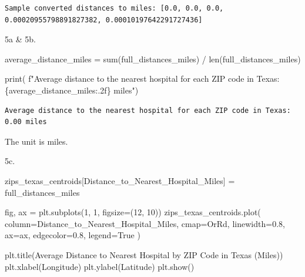 \documentclass[
  letterpaper,
  DIV=11,
  numbers=noendperiod]{scrartcl}
\newenvironment{Shaded}{\begin{snugshade}}{\end{snugshade}}
\newcommand{\BuiltInTok}[1]{\textcolor[rgb]{0.00,0.23,0.31}{#1}}
\newcommand{\DecValTok}[1]{\textcolor[rgb]{0.68,0.00,0.00}{#1}}
\newcommand{\FloatTok}[1]{\textcolor[rgb]{0.68,0.00,0.00}{#1}}
\newcommand{\NormalTok}[1]{\textcolor[rgb]{0.00,0.23,0.31}{#1}}
\newcommand{\OperatorTok}[1]{\textcolor[rgb]{0.37,0.37,0.37}{#1}}
\newcommand{\SpecialCharTok}[1]{\textcolor[rgb]{0.37,0.37,0.37}{#1}}
\newcommand{\SpecialStringTok}[1]{\textcolor[rgb]{0.13,0.47,0.30}{#1}}
\newcommand{\StringTok}[1]{\textcolor[rgb]{0.13,0.47,0.30}{#1}}
\newcommand{\VariableTok}[1]{\textcolor[rgb]{0.07,0.07,0.07}{#1}}
\begin{document}
\begin{verbatim}
Sample converted distances to miles: [0.0, 0.0, 0.0, 0.00020955798891827382, 0.00010197642291727436]
\end{verbatim}

5a \& 5b.

\begin{Shaded}
\begin{Highlighting}[]
\NormalTok{average\_distance\_miles }\OperatorTok{=} \BuiltInTok{sum}\NormalTok{(full\_distances\_miles) }\OperatorTok{/} \BuiltInTok{len}\NormalTok{(full\_distances\_miles)}

\BuiltInTok{print}\NormalTok{(}
    \SpecialStringTok{f"Average distance to the nearest hospital for each ZIP code in Texas: }\SpecialCharTok{\{}\NormalTok{average\_distance\_miles}\SpecialCharTok{:.2f\}}\SpecialStringTok{ miles"}\NormalTok{)}
\end{Highlighting}
\end{Shaded}

\begin{verbatim}
Average distance to the nearest hospital for each ZIP code in Texas: 0.00 miles
\end{verbatim}

The unit is miles.

5c.

\begin{Shaded}
\begin{Highlighting}[]
\NormalTok{zips\_texas\_centroids[}\StringTok{\textquotesingle{}Distance\_to\_Nearest\_Hospital\_Miles\textquotesingle{}}\NormalTok{] }\OperatorTok{=}\NormalTok{ full\_distances\_miles}

\NormalTok{fig, ax }\OperatorTok{=}\NormalTok{ plt.subplots(}\DecValTok{1}\NormalTok{, }\DecValTok{1}\NormalTok{, figsize}\OperatorTok{=}\NormalTok{(}\DecValTok{12}\NormalTok{, }\DecValTok{10}\NormalTok{))}
\NormalTok{zips\_texas\_centroids.plot(}
\NormalTok{    column}\OperatorTok{=}\StringTok{\textquotesingle{}Distance\_to\_Nearest\_Hospital\_Miles\textquotesingle{}}\NormalTok{,}
\NormalTok{    cmap}\OperatorTok{=}\StringTok{\textquotesingle{}OrRd\textquotesingle{}}\NormalTok{,}
\NormalTok{    linewidth}\OperatorTok{=}\FloatTok{0.8}\NormalTok{,}
\NormalTok{    ax}\OperatorTok{=}\NormalTok{ax,}
\NormalTok{    edgecolor}\OperatorTok{=}\StringTok{\textquotesingle{}0.8\textquotesingle{}}\NormalTok{,}
\NormalTok{    legend}\OperatorTok{=}\VariableTok{True}
\NormalTok{)}

\NormalTok{plt.title(}\StringTok{\textquotesingle{}Average Distance to Nearest Hospital by ZIP Code in Texas (Miles)\textquotesingle{}}\NormalTok{)}
\NormalTok{plt.xlabel(}\StringTok{\textquotesingle{}Longitude\textquotesingle{}}\NormalTok{)}
\NormalTok{plt.ylabel(}\StringTok{\textquotesingle{}Latitude\textquotesingle{}}\NormalTok{)}
\NormalTok{plt.show()}
\end{Highlighting}
\end{Shaded}
\end{document}

